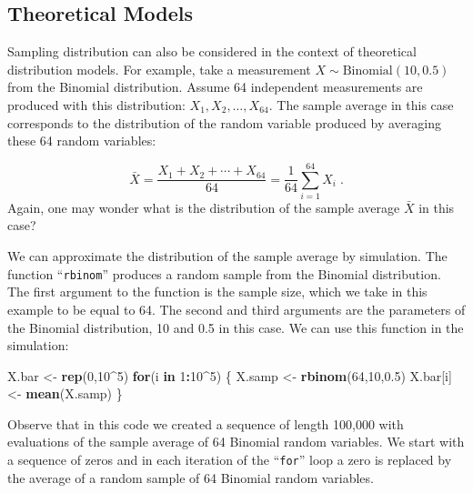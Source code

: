\documentclass[
]{krantz}
\makeatletter
\newenvironment{Shaded}{\begin{snugshade}}{\end{snugshade}}
\newcommand{\ControlFlowTok}[1]{\textcolor[rgb]{0.13,0.29,0.53}{\textbf{#1}}}
\newcommand{\DecValTok}[1]{\textcolor[rgb]{0.00,0.00,0.81}{#1}}
\newcommand{\FloatTok}[1]{\textcolor[rgb]{0.00,0.00,0.81}{#1}}
\newcommand{\KeywordTok}[1]{\textcolor[rgb]{0.13,0.29,0.53}{\textbf{#1}}}
\newcommand{\NormalTok}[1]{#1}
\newcommand{\OperatorTok}[1]{\textcolor[rgb]{0.81,0.36,0.00}{\textbf{#1}}}
\newcommand{\StringTok}[1]{\textcolor[rgb]{0.31,0.60,0.02}{#1}}
\newenvironment{kframe}{%
\medskip{}
\setlength{\fboxsep}{.8em}
 \def\at@end@of@kframe{}%
 \ifinner\ifhmode%
  \def\at@end@of@kframe{\end{minipage}}%
  \begin{minipage}{\columnwidth}%
 \fi\fi%
 \def\FrameCommand##1{\hskip\@totalleftmargin \hskip-\fboxsep
 \colorbox{shadecolor}{##1}\hskip-\fboxsep
     \hskip-\linewidth \hskip-\@totalleftmargin \hskip\columnwidth}%
 \MakeFramed {\advance\hsize-\width
   \@totalleftmargin\z@ \linewidth\hsize
   \@setminipage}}%
 {\par\unskip\endMakeFramed%
 \at@end@of@kframe}
\renewenvironment{Shaded}{\begin{kframe}}{\end{kframe}}
\theoremstyle{definition}
\theoremstyle{definition}
\theoremstyle{definition}
\theoremstyle{remark}
\makeatother
\begin{document}
\hypertarget{subsec:theoreticalmdls}{%
\subsection{Theoretical Models}\label{subsec:theoreticalmdls}}

Sampling distribution can also be considered in the context of
theoretical distribution models. For example, take a measurement
\(X \sim \mathrm{Binomial}(10,0.5)\) from the Binomial distribution.
Assume 64 independent measurements are produced with this distribution:
\(X_1, X_2, \ldots, X_{64}\). The sample average in this case corresponds
to the distribution of the random variable produced by averaging these
64 random variables:

\[\bar X = \frac{X_1 + X_2 + \cdots + X_{64}} {64} = \frac{1}{64}\sum_{i=1}^{64} X_i\;.\]
Again, one may wonder what is the distribution of the sample average
\(\bar X\) in this case?

We can approximate the distribution of the sample average by simulation.
The function ``\texttt{rbinom}'' produces a random sample from the Binomial
distribution. The first argument to the function is the sample size,
which we take in this example to be equal to 64. The second and third
arguments are the parameters of the Binomial distribution, 10 and 0.5 in
this case. We can use this function in the simulation:

\begin{Shaded}
\begin{Highlighting}[]
\NormalTok{X.bar <-}\StringTok{ }\KeywordTok{rep}\NormalTok{(}\DecValTok{0}\NormalTok{,}\DecValTok{10}\OperatorTok{^}\DecValTok{5}\NormalTok{)}
\ControlFlowTok{for}\NormalTok{(i }\ControlFlowTok{in} \DecValTok{1}\OperatorTok{:}\DecValTok{10}\OperatorTok{^}\DecValTok{5}\NormalTok{) \{}
\NormalTok{  X.samp <-}\StringTok{ }\KeywordTok{rbinom}\NormalTok{(}\DecValTok{64}\NormalTok{,}\DecValTok{10}\NormalTok{,}\FloatTok{0.5}\NormalTok{)}
\NormalTok{  X.bar[i] <-}\StringTok{ }\KeywordTok{mean}\NormalTok{(X.samp)}
\NormalTok{\}}
\end{Highlighting}
\end{Shaded}

Observe that in this code we created a sequence of length 100,000 with
evaluations of the sample average of 64 Binomial random variables. We
start with a sequence of zeros and in each iteration of the ``\texttt{for}'' loop
a zero is replaced by the average of a random sample of 64 Binomial
random variables.
\end{document}
